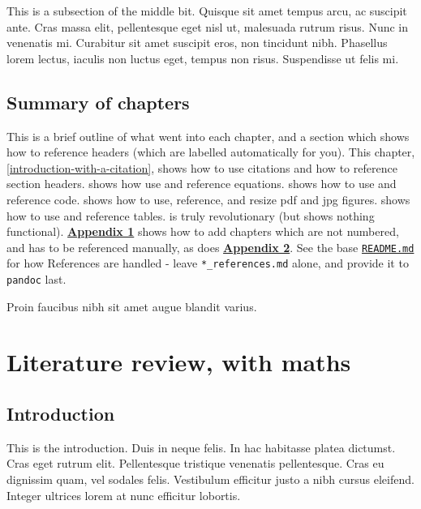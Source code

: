 \documentclass[12pt,a4paper,]{report}
\begin{document}
This is a subsection of the middle bit. Quisque sit amet tempus arcu, ac
suscipit ante. Cras massa elit, pellentesque eget nisl ut, malesuada
rutrum risus. Nunc in venenatis mi. Curabitur sit amet suscipit eros,
non tincidunt nibh. Phasellus lorem lectus, iaculis non luctus eget,
tempus non risus. Suspendisse ut felis mi.

\hypertarget{summary-of-chapters}{%
\section{Summary of chapters}\label{summary-of-chapters}}

This is a brief outline of what went into each chapter, and a section
which shows how to reference headers (which are labelled automatically
for you). This chapter, \cref{introduction-with-a-citation}, shows how
to use citations and how to reference section headers.
 shows how use and reference
equations.  shows how to use and
reference code.  shows how to use,
reference, and resize pdf and jpg figures.
 shows how to use and reference
tables.  is truly revolutionary (but shows
nothing functional).
\textbf{\protect\hyperlink{appendix-1-some-extra-stuff}{Appendix 1}}
shows how to add chapters which are not numbered, and has to be
referenced manually, as does
\textbf{\protect\hyperlink{appendix-2-some-more-extra-stuff}{Appendix
2}}. See the base
\href{https://github.com/tompollard/phd_thesis_markdown/blob/master/README.md}{\texttt{README.md}}
for how References are handled - leave \texttt{*\_references.md} alone,
and provide it to \texttt{pandoc} last.

Proin faucibus nibh sit amet augue blandit varius.

\hypertarget{literature-review-with-maths}{%
\chapter{Literature review, with
maths}\label{literature-review-with-maths}}

\hypertarget{introduction}{%
\section{Introduction}\label{introduction}}

This is the introduction. Duis in neque felis. In hac habitasse platea
dictumst. Cras eget rutrum elit. Pellentesque tristique venenatis
pellentesque. Cras eu dignissim quam, vel sodales felis. Vestibulum
efficitur justo a nibh cursus eleifend. Integer ultrices lorem at nunc
efficitur lobortis.
\end{document}
